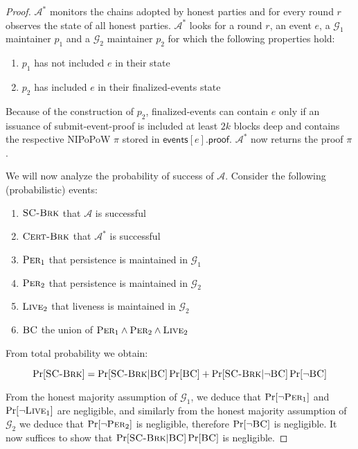 \begin{proof}
  $\mathcal{A}^*$ monitors the chains adopted by honest parties and for every
  round $r$ observes the state of all honest parties. $\mathcal{A}^*$ looks for
  a round $r$, an event $e$, a $\mathcal{G}_1$ maintainer $p_1$ and a
  $\mathcal{G}_2$ maintainer $p_2$ for which the following properties hold:

  \begin{enumerate}
    \item $p_1$ has not included $e$ in their state
    \item $p_2$ has included $e$ in their \textsf{finalized-events} state
  \end{enumerate}

  Because of the construction of $p_2$, \textsf{finalized-events} can contain
  $e$ only if an issuance of \textsf{submit-event-proof} is included at least
  $2k$ blocks deep and contains the respective NIPoPoW $\pi$ stored in
  $\textsf{events}[e].\textsf{proof}$. $\mathcal{A}^*$ now returns the proof
  $\pi$.

  We will now analyze the probability of success of $\mathcal{A}$. Consider
  the following (probabilistic) events:

  \begin{enumerate}
    \item $\textsc{SC-Brk}$ that $\mathcal{A}$ is successful
    \item $\textsc{Cert-Brk}$ that $\mathcal{A}^*$ is successful
    \item $\textsc{Per}_1$ that persistence is maintained in $\mathcal{G}_1$
    \item $\textsc{Per}_2$ that persistence is maintained in $\mathcal{G}_2$
    \item $\textsc{Live}_2$ that liveness is maintained in $\mathcal{G}_2$
    \item $\textsc{BC}$ the union of $\textsc{Per}_1 \land \textsc{Per}_2 \land \textsc{Live}_2$
  \end{enumerate}

  From total probability we obtain:

  \[
  \Pr[\textsc{SC-Brk}] = \Pr[\textsc{SC-Brk}|\textsc{BC}]\Pr[\textsc{BC}]
                       + \Pr[\textsc{SC-Brk}|\lnot \textsc{BC}]\Pr[\lnot \textsc{BC}]
  \]

  From the honest majority assumption of $\mathcal{G}_1$, we deduce that
  $\Pr[\lnot \textsc{Per}_1]$ and $\Pr[\lnot \textsc{Live}_1]$ are negligible,
  and similarly from the honest majority assumption of $\mathcal{G}_2$ we deduce
  that $\Pr[\lnot \textsc{Per}_2]$ is negligible, therefore
  $\Pr[\lnot \textsc{BC}]$ is negligible. It now suffices to show that
  $\Pr[\textsc{SC-Brk}|\textsc{BC}]\Pr[\textsc{BC}]$ is negligible.


\end{proof}
